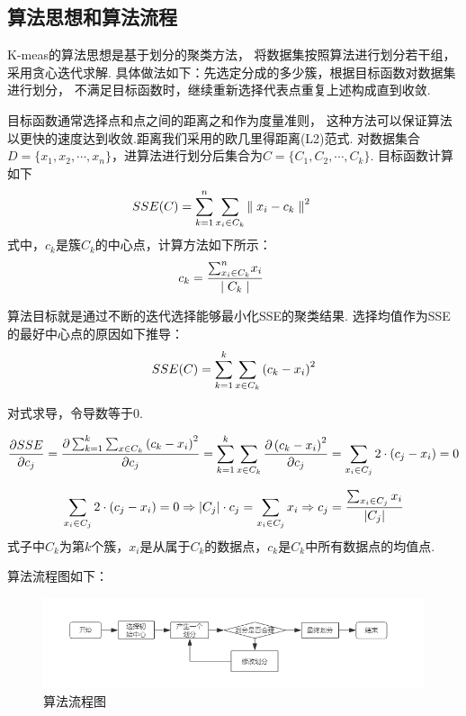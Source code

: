 \documentclass[bachelor,adobefonts]{jnuthesis}
\begin{document}
\subsection{算法思想和算法流程}
K-meas的算法\cite{张建萍2007基于聚类分析的}思想是基于划分的聚类方法，
将数据集按照算法进行划分若干组，采用贪心迭代求解.
具体做法如下：先选定分成的多少簇，根据目标函数对数据集进行划分，
不满足目标函数时，继续重新选择代表点重复上述构成直到收敛.

目标函数通常选择点和点之间的距离之和作为度量准则，
这种方法可以保证算法以更快的速度达到收敛.距离我们采用的欧几里得距离(L2)范式.
对数据集合$D =\{ x_1, x_2, \cdots, x_n \}$，进算法进行划分后集合为$C=\{ C_1, C_2, \cdots, C_k \}$.
目标函数计算如下
\begin{equation}
  \centering
  SSE(C) = \sum_{ k=1}^{n} \sum_{x_i \in C_k} {\parallel x_i - c_k \parallel}^2 \qquad 
\end{equation}
式中，$c_k$是簇$C_k$的中心点，计算方法如下所示：
\begin{equation}
  \centering
  c_k = \frac {{\sum_{x_i \in C_k}^{n}} x_i} {\mid C_k \mid} \qquad
\end{equation}

算法目标就是通过不断的迭代选择能够最小化SSE的聚类结果.
选择均值作为SSE的最好中心点的原因如下推导：
\begin{equation}
  \centering
  SSE(C) = \sum_{k=1}^{k}\sum_{x \in C_k}\left(c_k-x_i\right)^2
\end{equation}

对式求导，令导数等于0.

\begin{equation}
  \centering
  \frac{\partial SSE}{\partial c_j} = 
  \frac{\partial \sum_{k=1}^{k}\sum_{x \in C_k}\left(c_k-x_i\right)^2}
  {\partial c_j} = \sum_{k=1}^{k}\sum_{x \in C_k} 
  \frac{\partial \left(c_k-x_i\right)^2}{\partial c_j} = 
  \sum_{x_i \in C_j} 2 \cdot \left(c_j - x_i\right) = 0
\end{equation}

\begin{equation}
  \centering
  \sum_{x_i \in C_j} 2 \cdot  \left( c_j - x_i \right) = 0 
  \Rightarrow 
  \vert C_j \vert \cdot c_j = \sum_{x_i \in C_j} x_i 
  \Rightarrow 
  c_j = \frac {\sum_{x_i \in C_j} x_i }{\vert C_j \vert}
\end{equation}
式子中$C_k$为第$k$个簇，$x_i$是从属于$C_k$的数据点，$c_k$是$C_k$中所有数据点的均值点.

算法流程图如下：
\begin{figure}[h!]
  \centering
    \includegraphics[width=1.0\linewidth]{Wsuanfaliuchengtu.png}
  \caption{算法流程图}
\end{figure}
\end{document}
